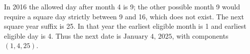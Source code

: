 In 2016 the allowed day after month 4 is 9; the other possible month 9 would require a square day strictly between 9 and 16, which does not exist. The next square year suffix is 25. In that year the earliest eligible month is 1 and earliest eligible day is 4. Thus the next date is $\boxed{\text{January 4, 2025}}$, with components $(1,4,25)$.
